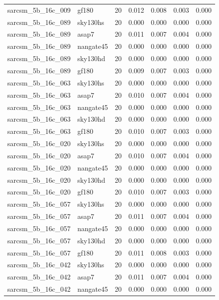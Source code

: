 \begin{tabular}{llrrrrr}
sarcsm\_5b\_16c\_009 & gf180 & 20 & 0.012 & 0.008 & 0.003 & 0.000 \\
sarcsm\_5b\_16c\_089 & sky130hs & 20 & 0.000 & 0.000 & 0.000 & 0.000 \\
sarcsm\_5b\_16c\_089 & asap7 & 20 & 0.011 & 0.007 & 0.004 & 0.000 \\
sarcsm\_5b\_16c\_089 & nangate45 & 20 & 0.000 & 0.000 & 0.000 & 0.000 \\
sarcsm\_5b\_16c\_089 & sky130hd & 20 & 0.000 & 0.000 & 0.000 & 0.000 \\
sarcsm\_5b\_16c\_089 & gf180 & 20 & 0.009 & 0.007 & 0.003 & 0.000 \\
sarcsm\_5b\_16c\_063 & sky130hs & 20 & 0.000 & 0.000 & 0.000 & 0.000 \\
sarcsm\_5b\_16c\_063 & asap7 & 20 & 0.010 & 0.007 & 0.004 & 0.000 \\
sarcsm\_5b\_16c\_063 & nangate45 & 20 & 0.000 & 0.000 & 0.000 & 0.000 \\
sarcsm\_5b\_16c\_063 & sky130hd & 20 & 0.000 & 0.000 & 0.000 & 0.000 \\
sarcsm\_5b\_16c\_063 & gf180 & 20 & 0.010 & 0.007 & 0.003 & 0.000 \\
sarcsm\_5b\_16c\_020 & sky130hs & 20 & 0.000 & 0.000 & 0.000 & 0.000 \\
sarcsm\_5b\_16c\_020 & asap7 & 20 & 0.010 & 0.007 & 0.004 & 0.000 \\
sarcsm\_5b\_16c\_020 & nangate45 & 20 & 0.000 & 0.000 & 0.000 & 0.000 \\
sarcsm\_5b\_16c\_020 & sky130hd & 20 & 0.000 & 0.000 & 0.000 & 0.000 \\
sarcsm\_5b\_16c\_020 & gf180 & 20 & 0.010 & 0.007 & 0.003 & 0.000 \\
sarcsm\_5b\_16c\_057 & sky130hs & 20 & 0.000 & 0.000 & 0.000 & 0.000 \\
sarcsm\_5b\_16c\_057 & asap7 & 20 & 0.011 & 0.007 & 0.004 & 0.000 \\
sarcsm\_5b\_16c\_057 & nangate45 & 20 & 0.000 & 0.000 & 0.000 & 0.000 \\
sarcsm\_5b\_16c\_057 & sky130hd & 20 & 0.000 & 0.000 & 0.000 & 0.000 \\
sarcsm\_5b\_16c\_057 & gf180 & 20 & 0.011 & 0.008 & 0.003 & 0.000 \\
sarcsm\_5b\_16c\_042 & sky130hs & 20 & 0.000 & 0.000 & 0.000 & 0.000 \\
sarcsm\_5b\_16c\_042 & asap7 & 20 & 0.011 & 0.007 & 0.004 & 0.000 \\
sarcsm\_5b\_16c\_042 & nangate45 & 20 & 0.000 & 0.000 & 0.000 & 0.000 \\

\end{tabular}
